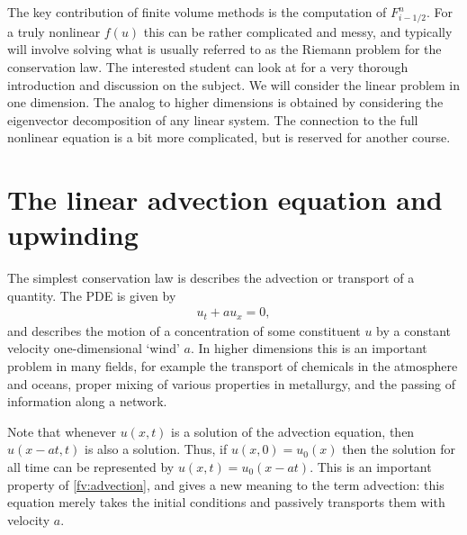 The key contribution of finite volume methods is the computation of $F_{i-1/2}^n$.  For a truly nonlinear $f(u)$ this can be rather complicated and messy, and typically will involve solving what is usually referred to as the Riemann problem for the conservation law.  
The interested student can look at \cite{Le2002} for a very thorough introduction and discussion on the subject.  
We will consider the linear problem in one dimension.  The analog to higher dimensions is obtained by considering the eigenvector decomposition of any linear system.  The connection to the full nonlinear equation is a bit more complicated, but is reserved for another course.

\section*{The linear advection equation and upwinding}
The simplest conservation law is describes the advection or transport of a quantity. The PDE is given by 
\begin{gather}
u_t + au_x = 0, \label{fv:advection}
\end{gather}
and describes the motion of a concentration of some constituent $u$ by a constant velocity one-dimensional `wind' $a$. 
In higher dimensions this is an important problem in many fields, for example the transport of chemicals in the atmosphere and oceans, proper mixing of various properties in metallurgy, and the passing of information along a network.

Note that whenever $u(x,t)$ is a solution of the advection equation, then $u(x-at,t)$ is also a solution.  Thus, if $u(x,0) = u_0(x)$ then the solution for all time can be represented by $u(x,t) = u_0(x-at)$.  This is an important property of \eqref{fv:advection}, and gives a new meaning to the term advection: this equation merely takes the initial conditions and passively transports them with velocity $a$.

